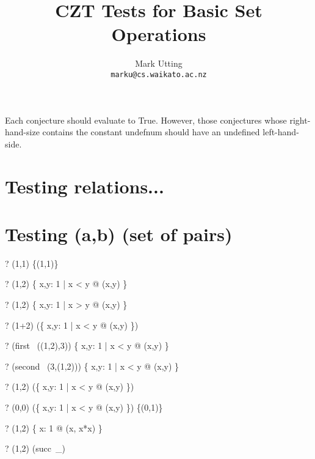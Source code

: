 \documentclass{article}
\title{CZT Tests for Basic Set Operations}
\author{Mark Utting \\ \texttt{marku@cs.waikato.ac.nz}}
\begin{document}
\maketitle

Each conjecture should evaluate to True.
However, those conjectures whose right-hand-size contains
the constant undefnum should have an undefined left-hand-side.


\section{Testing relations...}

\section{Testing (a,b) \in (set of pairs)}
\begin{zed} \vdash? (1,1) \in \{(1,1)\} \end{zed}
\begin{zed} \vdash? (1,2) \in \{ x,y: 1  | x < y @ (x,y) \} \end{zed}
\begin{zed} \vdash? (1,2) \notin \{ x,y: 1  | x > y @ (x,y) \} \end{zed}
\begin{zed} \vdash? (1+2) \in (\ran \{ x,y: 1  | x < y @ (x,y) \}) \end{zed}
\begin{zed} \vdash? (first~ ((1,2),3)) \in \{ x,y: 1  | x < y @ (x,y) \} \end{zed}
\begin{zed} \vdash? (second~ (3,(1,2))) \in \{ x,y: 1  | x < y @ (x,y) \} \end{zed}
\begin{zed} \vdash? (1,2) \in    (\{ x,y: 1  | x < y @ (x,y) \}) \cup \emptyset \end{zed}
\begin{zed} \vdash? (0,0) \notin (\{ x,y: 1  | x < y @ (x,y) \}) \cap \{(0,1)\} \end{zed}
\begin{zed} \vdash? (1,2) \notin \{ x: 1  @ (x, x*x) \} \end{zed}
\begin{zed} \vdash? (1,2) \in (succ~\_) \end{zed}
\end{document}
